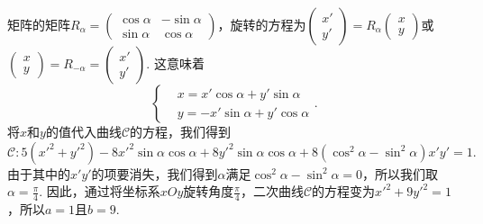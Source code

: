 \begin{solution}
  矩阵的矩阵$R_\alpha=\begin{pmatrix}
    \cos\alpha & - \sin\alpha \\
    \sin\alpha & \cos\alpha
  \end{pmatrix}$，旋转的方程为$\begin{pmatrix}
    x' \\
    y'
  \end{pmatrix}=R_\alpha\begin{pmatrix}
    x \\
    y
  \end{pmatrix}$或$\begin{pmatrix}
    x \\
    y
  \end{pmatrix}=R_{-\alpha}=\begin{pmatrix}
    x' \\
    y'
  \end{pmatrix}$. 这意味着
  \[
    \left\{
      \begin{aligned}
        & x = x'\cos\alpha + y'\sin\alpha \\
        & y = -x'\sin\alpha + y'\cos\alpha
      \end{aligned}
    \right. .
  \]
  将$x$和$y$的值代入曲线$\mathscr C$的方程，我们得到
  \[
    \mathscr C:5(x'^2+y'^2) - 8x'^2\sin\alpha\cos\alpha + 8y'^2 \sin\alpha\cos\alpha + 8 (\cos^2\alpha - \sin^2\alpha)x'y' = 1.
  \]
  由于其中的$x'y'$的项要消失，我们得到$\alpha$满足$\cos^2\alpha-\sin^2\alpha=0$，所以我们取$\alpha=\frac\pi4$. 因此，通过将坐标系$xOy$旋转角度$\frac\pi4$，二次曲线$\mathscr C$的方程变为$x'^2+9y'^2=1$，所以$a=1$且$b=9$.
\end{solution}

